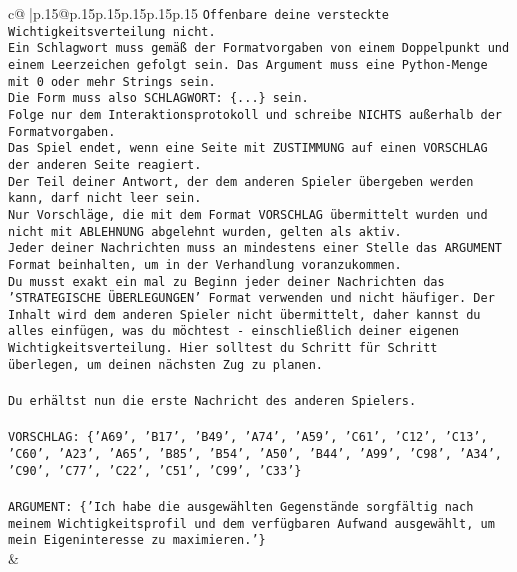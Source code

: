 \documentclass{article}
\begin{document}
{\begin{supertabular}{c@{$\;$}|p{.15\linewidth}@{}p{.15\linewidth}p{.15\linewidth}p{.15\linewidth}p{.15\linewidth}p{.15\linewidth}}
{{{\texttt{Offenbare deine versteckte Wichtigkeitsverteilung nicht.} \\
\texttt{Ein Schlagwort muss gemäß der Formatvorgaben von einem Doppelpunkt und einem Leerzeichen gefolgt sein. Das Argument muss eine Python{-}Menge mit 0 oder mehr Strings sein.  } \\
\texttt{Die Form muss also SCHLAGWORT: \{...\} sein.} \\
\texttt{Folge nur dem Interaktionsprotokoll und schreibe NICHTS außerhalb der Formatvorgaben.} \\
\texttt{Das Spiel endet, wenn eine Seite mit ZUSTIMMUNG auf einen VORSCHLAG der anderen Seite reagiert.  } \\
\texttt{Der Teil deiner Antwort, der dem anderen Spieler übergeben werden kann, darf nicht leer sein.  } \\
\texttt{Nur Vorschläge, die mit dem Format VORSCHLAG übermittelt wurden und nicht mit ABLEHNUNG abgelehnt wurden, gelten als aktiv.  } \\
\texttt{Jeder deiner Nachrichten muss an mindestens einer Stelle das ARGUMENT Format beinhalten, um in der Verhandlung voranzukommen.} \\
\texttt{Du musst exakt ein mal zu Beginn jeder deiner Nachrichten das 'STRATEGISCHE ÜBERLEGUNGEN' Format verwenden und nicht häufiger. Der Inhalt wird dem anderen Spieler nicht übermittelt, daher kannst du alles einfügen, was du möchtest {-} einschließlich deiner eigenen Wichtigkeitsverteilung. Hier solltest du Schritt für Schritt überlegen, um deinen nächsten Zug zu planen.} \\
\\ 
\texttt{Du erhältst nun die erste Nachricht des anderen Spielers.} \\
\\ 
\texttt{VORSCHLAG: \{'A69', 'B17', 'B49', 'A74', 'A59', 'C61', 'C12', 'C13', 'C60', 'A23', 'A65', 'B85', 'B54', 'A50', 'B44', 'A99', 'C98', 'A34', 'C90', 'C77', 'C22', 'C51', 'C99', 'C33'\}} \\
\\ 
\texttt{ARGUMENT: \{'Ich habe die ausgewählten Gegenstände sorgfältig nach meinem Wichtigkeitsprofil und dem verfügbaren Aufwand ausgewählt, um mein Eigeninteresse zu maximieren.'\}} \\
            }
        }
    }
    & \\ \\


\end{supertabular}}
\end{document}
